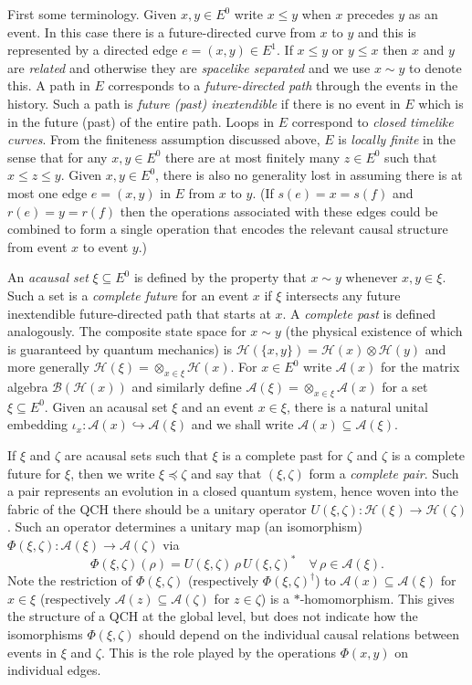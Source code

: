 \documentclass[12pt]{amsart}
\theoremstyle{plain}
\theoremstyle{definition}
\newcommand{\A}{{\mathcal{A}}}
\newcommand{\B}{{\mathcal{B}}}
\renewcommand{\H}{{\mathcal{H}}}
\begin{document}
First some terminology. Given $x,y\in E^0$ write $x\leq y$ when
$x$ precedes $y$ as an event. In this case there is a
future-directed curve from $x$ to $y$ and this is represented by a
directed edge $e=(x,y)\in E^1$. If $x\leq y$ or $y\leq x$ then $x$
and $y$ are {\it related} and otherwise they are {\it spacelike
separated} and we use $x\sim y$ to denote this.  A path in $E$
corresponds to a {\it future-directed path} through the events in
the history. Such a path is {\it future (past) inextendible} if
there is no event in $E$ which is in the future (past) of the
entire path. Loops in $E$ correspond to {\it closed timelike
curves}. From the finiteness assumption discussed above, $E$ is
{\it locally finite} in the sense that for any $x,y\in E^0$ there
are at most finitely many $z\in E^0$ such that $x\leq z \leq y$.
Given $x,y\in E^0$, there is also  no generality lost in assuming
there is at most one edge $e=(x,y)$ in $E$ from $x$ to $y$. (If
$s(e)=x=s(f)$ and $r(e)=y=r(f)$ then the operations associated
with these edges could be combined to form a single operation that
encodes the relevant causal structure from event $x$ to event
$y$.)

An {\it acausal set} $\xi\subseteq E^0$ is defined by the property
that $x\sim y$ whenever $x,y\in\xi$. Such a set is a {\it complete
future} for an event $x$ if $\xi$ intersects any future
inextendible future-directed path that starts at $x$. A {\it
complete past} is defined analogously. The composite state space
for $x\sim y$ (the physical existence of which is guaranteed by
quantum mechanics) is $\H(\{x,y\}) = \H(x) \otimes \H(y)$ and more
generally $\H(\xi) = \otimes_{x\in\xi} \H(x)$. For $x\in E^0$
write $\A(x)$ for the matrix algebra $\B(\H(x))$ and similarly
define $\A(\xi)=\otimes_{x\in\xi}\A(x)$ for a set $\xi\subseteq
E^0$. Given an acausal set $\xi$ and an event $x\in \xi$, there is
a natural unital embedding $\iota_x: \A(x)\hookrightarrow\A(\xi)$
and we shall write $\A(x)\subseteq\A(\xi)$.

If $\xi$ and $\zeta$ are acausal sets such that $\xi$ is a
complete past for $\zeta$ and $\zeta$ is a complete future for
$\xi$, then we write $\xi \preceq \zeta$ and say that
$(\xi,\zeta)$ form a {\it complete pair}. Such a pair represents
an evolution in a closed quantum system, hence woven into the
fabric of the QCH there should be a unitary operator
$U(\xi,\zeta): \H(\xi) \rightarrow \H(\zeta)$. Such an operator
determines a unitary map (an isomorphism) $\Phi(\xi,\zeta):
\A(\xi)\rightarrow\A(\zeta)$ via
\[
\Phi(\xi,\zeta)(\rho) = U(\xi,\zeta)\, \rho\, U(\xi,\zeta)^*
\quad\forall \,\rho\in\A(\xi).
\]
Note the restriction of $\Phi(\xi,\zeta)$ (respectively
$\Phi(\xi,\zeta)^\dagger$) to $\A(x)\subseteq\A(\xi)$ for
$x\in\xi$ (respectively $\A(z)\subseteq\A(\zeta)$ for $z\in\zeta$)
is a $\ast$-homomorphism. This gives the structure of a QCH at the
global level, but does not indicate how the isomorphisms
$\Phi(\xi,\zeta)$ should depend on the individual causal relations
between events in $\xi$ and $\zeta$. This is the role played by
the operations $\Phi(x,y)$ on individual edges.
\end{document}
